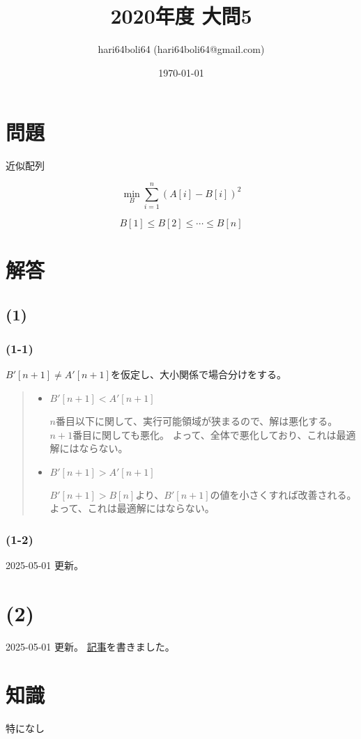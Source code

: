 \documentclass[a4paper, 10pt, dvipdfmx]{jlreq}
\begin{document}
\title{2020年度 大問5}
\author{hari64boli64 (hari64boli64@gmail.com)}
\date{\today}
\maketitle


\section{問題}

近似配列

\begin{equation*}
  \min_{B} \sum_{i=1}^{n}{(A[i]-B[i])^2}
\end{equation*}

$$
  B[1]\leq B[2] \leq \cdots \leq B[n]
$$

\section{解答}

\subsection*{(1)}

\subsubsection*{(1-1)}

$B'[n+1] \neq A'[n+1]$を仮定し、大小関係で場合分けをする。

\begin{quote}
  \begin{itemize}
    \item  $B'[n+1] < A'[n+1]$

          $n$番目以下に関して、実行可能領域が狭まるので、解は悪化する。
          $n+1$番目に関しても悪化。
          よって、全体で悪化しており、これは最適解にはならない。

    \item  $B'[n+1] > A'[n+1]$

          $B'[n+1]>B[n]$より、$B'[n+1]$の値を小さくすれば改善される。
          よって、これは最適解にはならない。
  \end{itemize}
\end{quote}


\subsubsection*{(1-2)}

2025-05-01 更新。

\section*{(2)}

2025-05-01 更新。 \href{https://qiita.com/hari64/items/23d8e8f20879871b2209}{記事}を書きました。

\section{知識}

特になし
\end{document}
